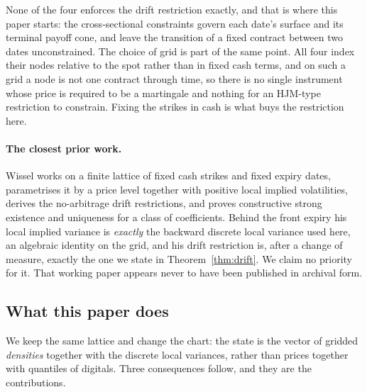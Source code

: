 None of the four enforces the drift restriction exactly, and that is where this paper starts:
the cross-sectional constraints govern each date's surface and its terminal
payoff cone, and leave the transition of a fixed contract between two dates
unconstrained. The choice of grid is part of the same point. All four index
their nodes relative to the spot rather than in fixed cash terms, and on such a
grid a node is not one contract through time, so there is no single instrument
whose price is required to be a martingale and nothing for an HJM-type
restriction to constrain. Fixing the strikes in cash is what buys the
restriction here.

\paragraph{The closest prior work.} Wissel \cite{Wissel2007} works on a finite lattice of fixed cash strikes and
fixed expiry dates, parametrises it by a price level together with positive local
implied volatilities, derives the no-arbitrage drift restrictions, and proves
constructive strong existence and uniqueness for a class of coefficients. Behind
the front expiry his local implied variance is \emph{exactly} the backward
discrete local variance used here, an algebraic identity on the grid, and his
drift restriction is, after a change
of measure, exactly the one we state in Theorem~\ref{thm:drift}. We claim no
priority for it. That working paper appears never to have been published in archival
form.

\subsection*{What this paper does}

We keep the same lattice and change the chart: the state is the vector of
gridded \emph{densities} together with the discrete local variances, rather than
prices together with quantiles of digitals. Three consequences follow, and they
are the contributions.

